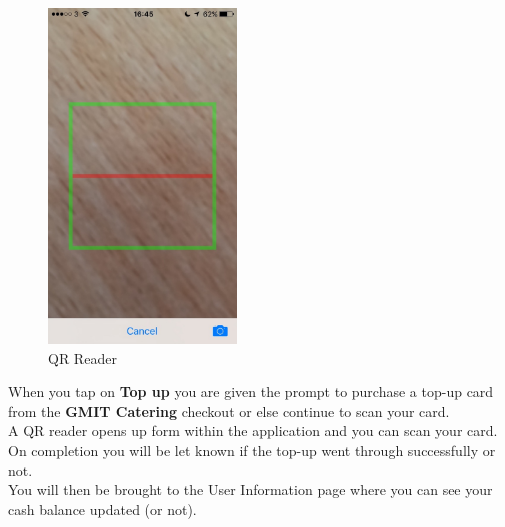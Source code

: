 \begin{minipage}{5cm}
	\begin{figure}[H]
		\includegraphics[width=5cm]{img/mobile-app/screen-shots/IMG_2915.jpg}
		\caption{QR Reader}
	\end{figure}
\end{minipage} \hfill
\begin{minipage}{0.55\textwidth}
When you tap on \textbf{Top up} you are given the prompt to purchase a top-up card from the \textbf{GMIT Catering} checkout or else continue to scan your card.
\\

A QR reader opens up form within the application and you can scan your card.
\\

On completion you will be let known if the top-up went through successfully or not.
\\

You will then be brought to the User Information page where you can see your cash balance updated (or not).
\end{minipage}

